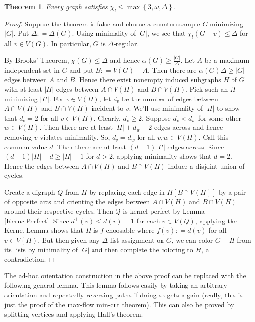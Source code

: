 \documentclass[12pt]{amsart}
\theoremstyle{plain}
\newtheorem{thm}{Theorem}
\theoremstyle{definition}
\theoremstyle{remark}
\newcommand{\set}[1]{\left\{ #1 \right\}}
\newcommand{\card}[1]{\left|#1\right|}
\newcommand{\DefinedAs}{\mathrel{\mathop:}=}
\begin{document}
\begin{thm}
Every graph satisfies $\chi_l \le \max\set{3, \omega, \Delta}$.
\end{thm}
\begin{proof}
Suppose the theorem is false and choose a counterexample $G$ minimizing
$\card{G}$.  Put $\Delta \DefinedAs \Delta(G)$. Using minimality of $\card{G}$,
we see that $\chi_l(G - v) \leq \Delta$ for all $v \in
V(G)$. In particular, $G$ is $\Delta$-regular.

By Brooks' Theorem, $\chi(G) \le \Delta$ and hence $\alpha(G) \ge \frac{|G|}{\Delta}$.  Let $A$ be a maximum independent set in $G$ and put $B \DefinedAs V(G) - A$.
Then there are $\alpha(G)\Delta \ge |G|$ edges between $A$ and $B$.  Hence there exist nonempty induced subgraphs $H$ of $G$ with at least $|H|$ edges between $A \cap V(H)$ and $B \cap V(H)$. 
Pick such an $H$ minimizing $|H|$.  For $v \in V(H)$, let $d_v$ be the number of edges between $A \cap V(H)$ and $B \cap V(H)$ incident to $v$. We'll use minimality of $|H|$ to show that $d_v=2$ for all $v \in V(H)$.  Clearly, $d_v \ge 2$.  Suppose $d_v < d_w$ for some other $w \in V(H)$. Then there are at least $|H| + d_w - 2$ edges across and hence removing $v$ violates minimality.  So, $d_v = d_w$ for all $v,w \in V(H)$. Call this common value $d$.  Then there are at least $(d-1)|H|$ edges across.  Since $(d-1)|H| - d \ge |H| - 1$ for $d > 2$, applying minimality shows that $d=2$.  Hence the edges between $A \cap V(H)$ and $B \cap V(H)$ induce a disjoint union of cycles.

Create a digraph $Q$ from $H$ by replacing each edge in $H[B \cap V(H)]$ by a pair of opposite arcs and orienting the edges between $A \cap V(H)$ and $B \cap V(H)$ around their respective cycles.  Then $Q$ is kernel-perfect by Lemma \ref{KernelPerfect}.  Since $d^+(v) \le d(v) - 1$ for each $v \in V(Q)$, applying the Kernel Lemma shows that $H$ is $f$-choosable where $f(v) \DefinedAs d(v)$ for all $v \in V(H)$.  But then given any $\Delta$-list-assignment on $G$, we can color $G-H$ from its lists by minimality of $|G|$ and then complete the coloring to $H$, a contradiction.
\end{proof}

The ad-hoc orientation construction in the above proof can be replaced with the following general lemma.  This lemma follows easily by taking an arbitrary orientation and repeatedly reversing paths if doing so gets a gain (really, this is just the proof of the max-flow min-cut theorem).  This can also be proved by splitting vertices and applying Hall's theorem.
\end{document}
